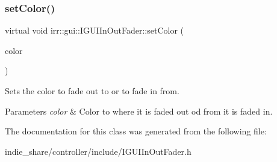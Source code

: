 \subsubsection{\texorpdfstring{set\+Color()}{setColor()}}
{\footnotesize\ttfamily virtual void irr\+::gui\+::\+I\+G\+U\+I\+In\+Out\+Fader\+::set\+Color (\begin{DoxyParamCaption}\item[{\hyperlink{classirr_1_1video_1_1SColor}{video\+::\+S\+Color}}]{color }\end{DoxyParamCaption})\hspace{0.3cm}{\ttfamily [pure virtual]}}



Sets the color to fade out to or to fade in from. 


\begin{DoxyParams}{Parameters}
{\em color} & Color to where it is faded out od from it is faded in. \\
\hline
\end{DoxyParams}


The documentation for this class was generated from the following file\+:\begin{DoxyCompactItemize}
\item 
indie\+\_\+share/controller/include/I\+G\+U\+I\+In\+Out\+Fader.\+h\end{DoxyCompactItemize}
